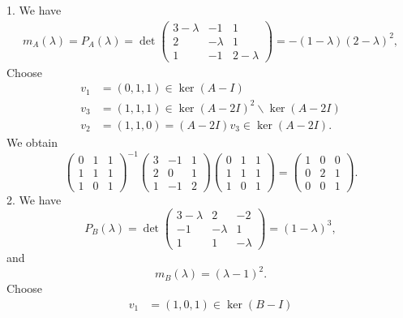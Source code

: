 ﻿\documentclass[12pt]{article}
\begin{document}
\begin{sol}
    1. We have
    \begin{align*}
        m_{A}(\lambda) = P_A(\lambda) = \det\begin{pmatrix}
            3 - \lambda & -1 & 1\\
            2 & -\lambda & 1\\
            1 & -1 & 2 - \lambda
        \end{pmatrix} = -(1 - \lambda)(2 - \lambda)^2,
    \end{align*}
    Choose 
    \begin{align*}
        v_1 &= (0,1,1) \in \ker(A - I)\\
        v_3 &= (1,1,1) \in \ker(A - 2I)^2 \backslash \ker(A - 2I)\\
        v_2 &= (1,1,0)= (A - 2I)v_3  \in \ker(A - 2I).
    \end{align*}
    We obtain 
    \[
        \begin{pmatrix}
            0 & 1 & 1\\
            1 & 1 & 1\\
            1 & 0 & 1
        \end{pmatrix}^{-1}\begin{pmatrix}
            3 & -1 & 1 \\
            2 & 0 & 1\\
            1 & -1 & 2
        \end{pmatrix}
        \begin{pmatrix}
            0 & 1 & 1\\
            1 & 1 & 1\\
            1 & 0 & 1
        \end{pmatrix}
        = \begin{pmatrix}
            1 & 0 & 0\\
            0 & 2 & 1\\
            0 & 0 & 1
        \end{pmatrix}.
    \]
    2. We have 
    \[
        P_B(\lambda) = \det\begin{pmatrix}
            3 - \lambda & 2 & -2\\
            -1 & -\lambda & 1\\
            1 & 1 & -\lambda
        \end{pmatrix} = (1 - \lambda)^3,
    \]
    and 
    \[
        m_{B}(\lambda) = (\lambda - 1)^2.
    \]
    Choose 
    \begin{align*}
        v_1 &= (1,0,1) \in \ker(B - I)\\

\end{align*}
\end{sol}
\end{document}
